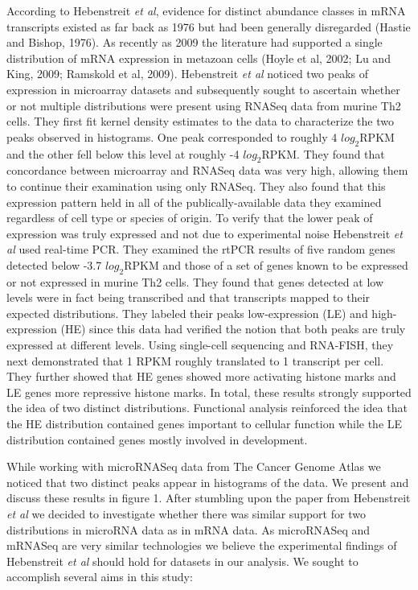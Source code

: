 \documentclass[12pt]{report}
\begin{document}
 According to Hebenstreit \emph{et al}, evidence for distinct abundance classes in mRNA transcripts existed as far back 
 as 1976 but had been generally disregarded (Hastie and Bishop, 1976). As recently as 2009 the literature 
 had supported a single distribution of mRNA expression in metazoan cells (Hoyle et al, 2002; Lu and King, 2009; Ramskold et al, 2009). 
 Hebenstreit \emph{et al} noticed two peaks of expression in microarray datasets 
 and subsequently sought to ascertain whether or not multiple distributions were 
 present using RNASeq data from murine Th2 cells. They first fit kernel density estimates to the data 
 to characterize the two peaks observed in histograms. One peak corresponded to roughly 4 $log_{2} \text{RPKM}$
 and the other fell below this level  at roughly -4 $log_{2} \text{RPKM}$. They found that concordance 
 between microarray and RNASeq data was very high, allowing them to continue 
 their examination using only RNASeq. They also found that this expression pattern held
 in all of the publically-available data they examined regardless of cell type or species of origin.
 To verify that the lower peak of expression was truly expressed and not due to 
 experimental noise Hebenstreit \emph{et al} used real-time PCR. They examined 
 the rtPCR results of five random genes detected below -3.7 $log_{2} \text{RPKM}$ 
 and those of a set of genes known to be expressed or not expressed in murine 
 Th2 cells. They found that genes detected at low levels were in fact being 
 transcribed and that transcripts mapped to their expected distributions.
  They labeled their peaks low-expression (LE) and high-expression 
 (HE) since this data had verified the notion that both peaks are truly 
 expressed at different levels. Using single-cell sequencing and RNA-FISH, they 
 next demonstrated that 1 RPKM roughly translated to 1 transcript per cell. They 
 further showed that HE genes showed more activating histone marks and LE genes 
 more repressive histone marks. In total, these results strongly supported the 
 idea of two distinct distributions. Functional analysis reinforced the idea 
 that the HE distribution contained genes important to cellular function while 
 the LE distribution contained genes mostly involved in development.
 
 While working with microRNASeq data from The Cancer Genome Atlas we noticed 
 that two distinct peaks appear in histograms of the data. We present and 
 discuss these results in figure 1. After stumbling upon the paper from Hebenstreit \emph{et al} 
we decided to investigate whether there was similar support for two 
distributions in microRNA data as in mRNA data. As microRNASeq and mRNASeq are 
very similar technologies we believe the experimental findings of Hebenstreit \emph{et al} 
should hold for datasets in our analysis. We sought to accomplish several aims in 
this study:
\end{document}

